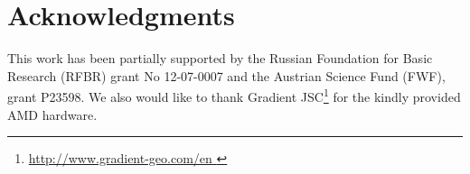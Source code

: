 \documentclass[final]{siamltex}
\begin{document}
\section{Acknowledgments}

This work has been partially supported by the Russian Foundation for Basic
Research (RFBR) grant No 12-07-0007 and the Austrian Science Fund (FWF), grant
P23598.  We also would like to thank Gradient JSC\footnote{ \href{
http://www.gradient-geo.com/en }{ http://www.gradient-geo.com/en } } for the
kindly provided AMD hardware.




\end{document}

